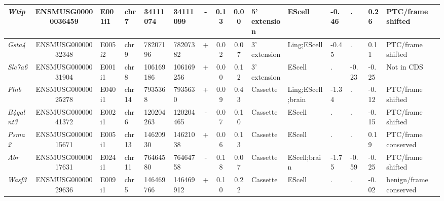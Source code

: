 \begin{landscape}
\begin{table}[htbp]
{\begin{tabular}{|l|c|l|l|l|l|c|c|c|l|l|l|l|l|l|}
		\textit{Wtip} & ENSMUSG00000036459 & E001i1 & chr7  & 34111074 & 34111099 & -     & 0.13  & 0.00  & 5' extension & EScell & -0.46 & .     & 0.26  & PTC/frame shifted \\ \hline
		\textit{Gsta4} & ENSMUSG00000032348 & E005i2 & chr9  & 78207196 & 78207382 & +     & 0.02  & 0.07  & 3' extension & Ling;EScell & -0.45 & .     & 0.11  & PTC/frame shifted \\ \hline
		\textit{Slc7a6} & ENSMUSG00000031904 & E001i1 & chr8  & 106169186 & 106169256 & +     & 0.00  & 0.12  & 3' extension & EScell & .     & -0.23 & -0.25 & Not in CDS \\ \hline
		\textit{Flnb} & ENSMUSG00000025278 & E040i1 & chr14 & 7935368 & 7935630 & +     & 0.09  & 0.43  & Cassette & Ling;EScell;brain & -1.34 & .     & -0.12 & PTC/frame shifted \\ \hline
		\textit{B4galnt3} & ENSMUSG00000041372 & E002i1 & chr6  & 120204263 & 120204465 & -     & 0.07  & 0.10  & Cassette & EScell & .     & .     & -0.15 & PTC/frame shifted \\ \hline
		\textit{Psma2} & ENSMUSG00000015671 & E005i1 & chr13 & 14620930 & 14621038 & +     & 0.06  & 0.13  & Cassette & EScell & .     & .     & 0.19  & PTC/frame conserved \\ \hline
		\textit{Abr} & ENSMUSG00000017631 & E024i1 & chr11 & 76464580 & 76464758 & -     & 0.18  & 0.07  & Cassette & EScell;brain & -1.75 & -0.59 & -0.25 & PTC/frame shifted \\ \hline
		\textit{Wasf3} & ENSMUSG00000029636 & E009i1 & chr5  & 146469766 & 146469912 & +     & 0.10  & 0.22  & Cassette & EScell & .     & .     & -0.02 & benign/frame conserved \\ \hline
	\end{tabular}%
	}
\end{table}%

\clearpage


\end{landscape}
